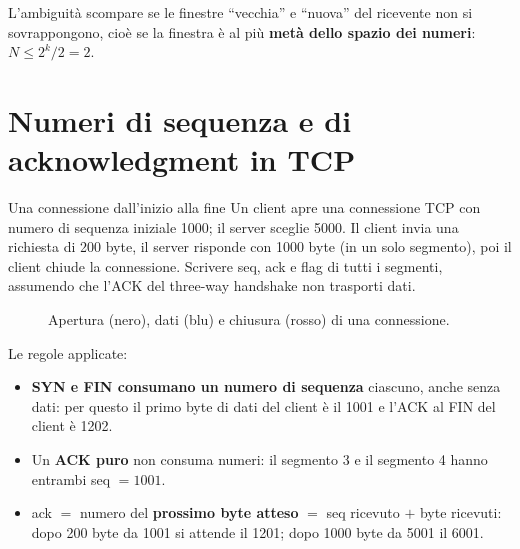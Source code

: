 L'ambiguità scompare se le finestre ``vecchia'' e ``nuova'' del ricevente non si sovrappongono, cioè se la finestra è al più
\textbf{metà dello spazio dei numeri}: $N \le 2^k/2 = 2$.

\section{Numeri di sequenza e di acknowledgment in TCP}

\begin{esercizio}{Una connessione dall'inizio alla fine}
Un client apre una connessione TCP con numero di sequenza iniziale 1000; il server sceglie 5000. Il client invia una richiesta di
200 byte, il server risponde con 1000 byte (in un solo segmento), poi il client chiude la connessione. Scrivere seq, ack e flag
di tutti i segmenti, assumendo che l'ACK del three-way handshake non trasporti dati.
\end{esercizio}

\svolgimento
\begin{figure}[H]
\centering
{}
\caption{Apertura (nero), dati (blu) e chiusura (rosso) di una connessione.}
\end{figure}

Le regole applicate:
\begin{itemize}
    \item \textbf{SYN e FIN consumano un numero di sequenza} ciascuno, anche senza dati: per questo il primo byte di dati del
          client è il 1001 e l'ACK al FIN del client è 1202.
    \item Un \textbf{ACK puro} non consuma numeri: il segmento 3 e il segmento 4 hanno entrambi seq $= 1001$.
    \item ack $=$ numero del \textbf{prossimo byte atteso} $=$ seq ricevuto $+$ byte ricevuti: dopo 200 byte da 1001 si attende il
          1201; dopo 1000 byte da 5001 il 6001.
\end{itemize}

